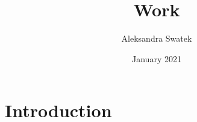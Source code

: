 \documentclass{article}
\title{Work}
\author{Aleksandra Swatek}
\date{January 2021}
\begin{document}
\maketitle

\section{Introduction}
\end{document}
